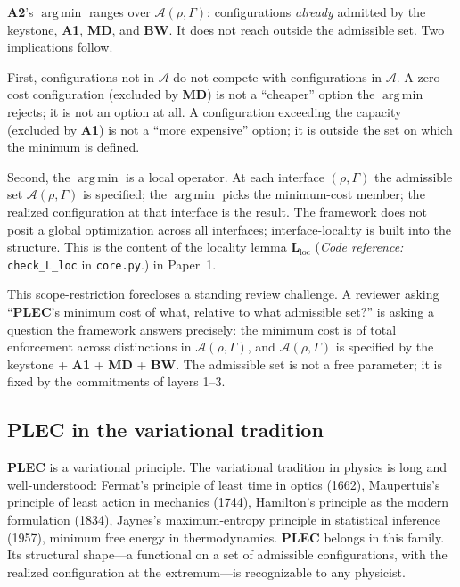 \documentclass[11pt]{article}
\newcommand{\coderef}[2]{\smallskip\noindent\textit{Code reference:} \texttt{#1} in \texttt{#2}.}
\newcommand{\Aone}{\textbf{A1}}
\newcommand{\PLEC}{\textbf{PLEC}}
\newcommand{\argmin}{\mathop{\mathrm{arg\,min}}}
\begin{document}
\textbf{A2}'s $\argmin$ ranges over $\mathcal{A}(\rho, \Gamma)$: configurations \emph{already} admitted by the keystone, \Aone{}, \textbf{MD}, and \textbf{BW}. It does not reach outside the admissible set. Two implications follow.

First, configurations not in $\mathcal{A}$ do not compete with configurations in $\mathcal{A}$. A zero-cost configuration (excluded by \textbf{MD}) is not a ``cheaper'' option the $\argmin$ rejects; it is not an option at all. A configuration exceeding the capacity (excluded by \Aone{}) is not a ``more expensive'' option; it is outside the set on which the minimum is defined.

Second, the $\argmin$ is a local operator. At each interface $(\rho, \Gamma)$ the admissible set $\mathcal{A}(\rho, \Gamma)$ is specified; the $\argmin$ picks the minimum-cost member; the realized configuration at that interface is the result. The framework does not posit a global optimization across all interfaces; interface-locality is built into the structure. This is the content of the locality lemma \textbf{L}$_{\mathrm{loc}}$ (\coderef{check\_L\_loc}{core.py}) in Paper~1.

This scope-restriction forecloses a standing review challenge. A reviewer asking ``\PLEC{}'s minimum cost of what, relative to what admissible set?'' is asking a question the framework answers precisely: the minimum cost is of total enforcement across distinctions in $\mathcal{A}(\rho, \Gamma)$, and $\mathcal{A}(\rho, \Gamma)$ is specified by the keystone + \Aone{} + \textbf{MD} + \textbf{BW}. The admissible set is not a free parameter; it is fixed by the commitments of layers 1--3.

\subsection{PLEC in the variational tradition}\label{sec:PLEC_tradition}

\PLEC{} is a variational principle. The variational tradition in physics is long and well-understood: Fermat's principle of least time in optics (1662), Maupertuis's principle of least action in mechanics (1744), Hamilton's principle as the modern formulation (1834), Jaynes's maximum-entropy principle in statistical inference (1957), minimum free energy in thermodynamics. \PLEC{} belongs in this family. Its structural shape---a functional on a set of admissible configurations, with the realized configuration at the extremum---is recognizable to any physicist.
\end{document}
